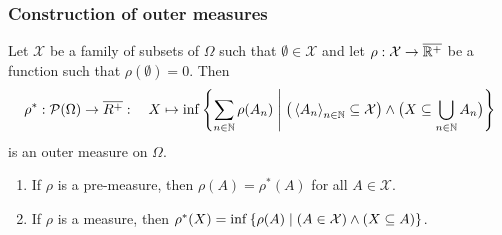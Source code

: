 \subsubsection{Construction of outer measures}
\begin{proposition} \label{outerMeasureConstruction}
Let $\mathcal{X}$ be a family of subsets of $\Omega$ such that $\emptyset\in \mathcal{X}$ and let $\rho: \mathcal{X}\to \overline{\mathbb{R}^+}$ be a function such that $\rho(\emptyset) = 0$. Then
\[ \rho^*: \powerset(\Omega) \to \overline{R^+}:\quad X\mapsto  \inf\setbuilder{\sum_{n\in\N}\rho(A_n)}{\big(\seq{A_n}_{n\in\N}\subseteq \mathcal{X}\big) \land \big(X\subseteq \bigcup_{n\in\N}A_n\big)} \]
is an outer measure on $\Omega$.
\begin{enumerate}
\item If $\rho$ is a pre-measure, then $\rho(A) = \rho^*(A)$ for all $A\in\mathcal{X}$.
\item If $\rho$ is a measure, then $\rho^*(X) = \inf\setbuilder{\rho(A)}{(A\in \mathcal{X}) \land (X\subseteq A)}$.
\end{enumerate}
\end{proposition}
